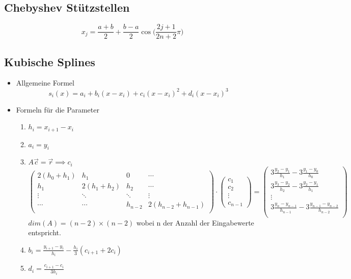 \subsection{Chebyshev Stützstellen}

\begin{equation*}
	x_j = \frac{a+b}{2} + \frac{b-a}{2} \cos\bigg(\frac{2j + 1}{2n + 2} \pi\bigg)
\end{equation*}

\subsection{Kubische Splines}

\begin{itemize}
	
	\item Allgemeine Formel \\
	\begin{equation*}
		s_i(x) = a_i + b_i (x - x_i) + c_i (x - x_i)^2 + d_i (x - x_i)^3
	\end{equation*}
	
	\item Formeln für die Parameter \\
	\begin{enumerate}
		\item $h_i = x_{i+1} - x_i$
		\item $a_i = y_i$
		\item $A\vec{c}=\vec{r} \implies c_i$
		\begin{displaymath}
			\begin{pmatrix}
				2(h_0 + h_1)	& h_1	& 0 	& \cdots \\
				h_1	& 2(h_1 + h_2)	& h_2		& \cdots \\
				\vdots	& \ddots	& \ddots	& \vdots \\
				\cdots	& \cdots	& h_{n-2}	& 2(h_{n-2} + h_{n-1}) \\
			\end{pmatrix}
			\cdot 
			\begin{pmatrix}
				c_1 \\ c_2 \\ \vdots \\ c_{n-1}
			\end{pmatrix}						
			= 
			\begin{pmatrix}
				3\frac{y_2-y_1}{h_1} - 3\frac{y_1-y_0}{h_0} \\
				3\frac{y_3-y_2}{h_2} - 3\frac{y_2-y_1}{h_1} \\
				\vdots \\
				3\frac{y_n-y_{n-1}}{h_{n-1}} - 3\frac{y_{n-1}-y_{n-2}}{h_{n-2}} \\
			\end{pmatrix}
		\end{displaymath}
		$dim(A) = (n-2) \times (n-2)$ wobei n der Anzahl der Eingabewerte entspricht.
		\item $b_i = \frac{y_{i+1} - y_i}{h_i} - \frac{h_i}{3} (c_{i+1} + 2c_i)$
		\item $d_i = \frac{c_{i+1} - c_i}{3 h_i}$
	\end{enumerate}
	

\end{itemize}

